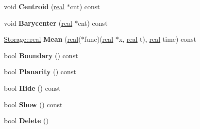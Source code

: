 \begin{DoxyCompactItemize}
\item 
\hypertarget{classINMOST_1_1Element_a5e512645c1f8082d9fe401effc6deb2e}{void {\bfseries Centroid} (\hyperlink{classINMOST_1_1Storage_a853346784b4a5822a7fac54d8f10f805}{real} $\ast$cnt) const }\label{classINMOST_1_1Element_a5e512645c1f8082d9fe401effc6deb2e}

\item 
\hypertarget{classINMOST_1_1Element_a006a4b60505738c328560656a4279b53}{void {\bfseries Barycenter} (\hyperlink{classINMOST_1_1Storage_a853346784b4a5822a7fac54d8f10f805}{real} $\ast$cnt) const }\label{classINMOST_1_1Element_a006a4b60505738c328560656a4279b53}

\item 
\hypertarget{classINMOST_1_1Element_a0409db870d0ac2787f10f4e16ccfd5b9}{\hyperlink{classINMOST_1_1Storage_a853346784b4a5822a7fac54d8f10f805}{Storage\-::real} {\bfseries Mean} (\hyperlink{classINMOST_1_1Storage_a853346784b4a5822a7fac54d8f10f805}{real}($\ast$func)(\hyperlink{classINMOST_1_1Storage_a853346784b4a5822a7fac54d8f10f805}{real} $\ast$x, \hyperlink{classINMOST_1_1Storage_a853346784b4a5822a7fac54d8f10f805}{real} t), \hyperlink{classINMOST_1_1Storage_a853346784b4a5822a7fac54d8f10f805}{real} time) const }\label{classINMOST_1_1Element_a0409db870d0ac2787f10f4e16ccfd5b9}

\item 
\hypertarget{classINMOST_1_1Element_a1549d3353773bc9a020fd4e196520fbc}{bool {\bfseries Boundary} () const }\label{classINMOST_1_1Element_a1549d3353773bc9a020fd4e196520fbc}

\item 
\hypertarget{classINMOST_1_1Element_aa7881c66a2afd84eaa0089e62230bc39}{bool {\bfseries Planarity} () const }\label{classINMOST_1_1Element_aa7881c66a2afd84eaa0089e62230bc39}

\item 
\hypertarget{classINMOST_1_1Element_a2a6833f66a162e7684c33871d196c3fe}{bool {\bfseries Hide} () const }\label{classINMOST_1_1Element_a2a6833f66a162e7684c33871d196c3fe}

\item 
\hypertarget{classINMOST_1_1Element_a9b00fa9fb06ad1e1f88b17aa8d26d168}{bool {\bfseries Show} () const }\label{classINMOST_1_1Element_a9b00fa9fb06ad1e1f88b17aa8d26d168}

\item 
\hypertarget{classINMOST_1_1Element_ab07dd77f97d0c81c90b62cdcecdcf2a9}{bool {\bfseries Delete} ()}\label{classINMOST_1_1Element_ab07dd77f97d0c81c90b62cdcecdcf2a9}


\end{DoxyCompactItemize}
